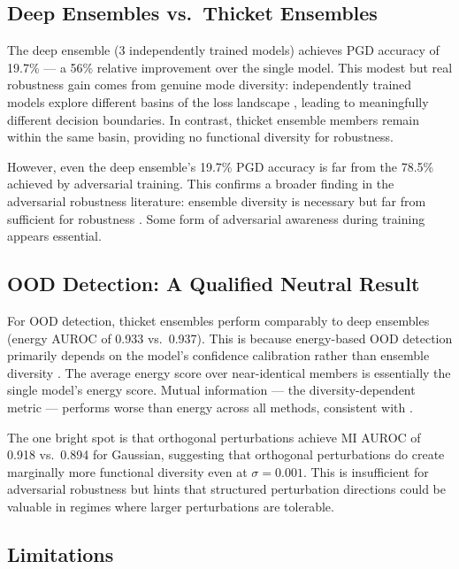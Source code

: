 \subsection{Deep Ensembles vs.\ Thicket Ensembles}

The deep ensemble (3 independently trained models) achieves PGD accuracy of 19.7\% --- a 56\% relative improvement over the single model. This modest but real robustness gain comes from genuine mode diversity: independently trained models explore different basins of the loss landscape \citep{fort2019deep}, leading to meaningfully different decision boundaries. In contrast, thicket ensemble members remain within the same basin, providing no functional diversity for robustness.

However, even the deep ensemble's 19.7\% PGD accuracy is far from the 78.5\% achieved by adversarial training. This confirms a broader finding in the adversarial robustness literature: ensemble diversity is necessary but far from sufficient for robustness \citep{pang2019improving}. Some form of adversarial awareness during training appears essential.

\subsection{OOD Detection: A Qualified Neutral Result}

For OOD detection, thicket ensembles perform comparably to deep ensembles (energy AUROC of 0.933 vs.\ 0.937). This is because energy-based OOD detection primarily depends on the model's confidence calibration rather than ensemble diversity \citep{xia2022usefulness}. The average energy score over near-identical members is essentially the single model's energy score. Mutual information --- the diversity-dependent metric --- performs worse than energy across all methods, consistent with \citet{xia2022usefulness}.

The one bright spot is that orthogonal perturbations achieve MI AUROC of 0.918 vs.\ 0.894 for Gaussian, suggesting that orthogonal perturbations do create marginally more functional diversity even at $\sigma = 0.001$. This is insufficient for adversarial robustness but hints that structured perturbation directions could be valuable in regimes where larger perturbations are tolerable.

\subsection{Limitations}

